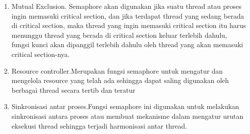 		 \begin{enumerate}
		 	\item Mutual Exclusion. Semaphore akan digunakan jika suatu thread atau proses ingin memasuki critical section, dan jika terdapat thread yang sedang berada di critical section, maka thread yang ingin memasuki critical section itu harus menunggu thread yang berada di critical section keluar terlebih dahulu, fungsi kunci akan dipanggil terlebih dahulu oleh thread yang akan memasuki critical section-nya.
			\item Resource controller.Merupakan fungsi semaphore untuk mengatur dan mengelola resource yang  telah ada sehingga dapat saling digunakan oleh berbagai thread secara tertib dan teratur
			\item Sinkronisasi antar proses.Fungsi semaphore ini digunakan  untuk melakukan sinkronisasi antara proses atau membuat mekanisme dalam mengatur urutan eksekusi thread sehingga terjadi harmonisasi antar thread.
		\end{enumerate}
		 	